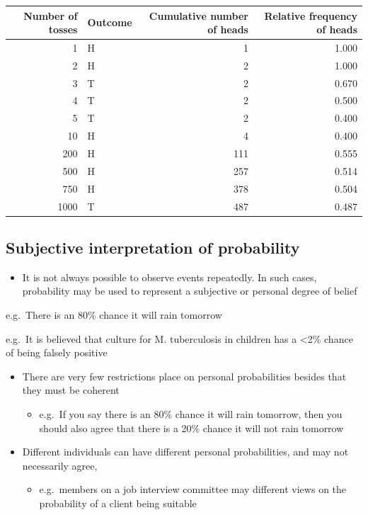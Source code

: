 \documentclass[
]{book}
\providecommand{\tightlist}{%
  \setlength{\itemsep}{0pt}\setlength{\parskip}{0pt}}
\begin{document}
\begin{tabular}{r|l|r|r}
\hline
Number of tosses & Outcome & Cumulative number of heads & Relative frequency of heads\\
\hline
1 & H & 1 & 1.000\\
\hline
2 & H & 2 & 1.000\\
\hline
3 & T & 2 & 0.670\\
\hline
4 & T & 2 & 0.500\\
\hline
5 & T & 2 & 0.400\\
\hline
10 & H & 4 & 0.400\\
\hline
200 & H & 111 & 0.555\\
\hline
500 & H & 257 & 0.514\\
\hline
750 & H & 378 & 0.504\\
\hline
1000 & T & 487 & 0.487\\
\hline
\end{tabular}

\hypertarget{subjective-interpretation-of-probability}{%
\subsection{Subjective interpretation of probability}\label{subjective-interpretation-of-probability}}

\begin{itemize}
\tightlist
\item
  It is not always possible to observe events repeatedly. In such cases, probability may be used to represent a subjective or personal degree of belief
\end{itemize}

e.g.~There is an 80\% chance it will rain tomorrow

e.g.~It is believed that culture for M. tuberculosis in children has a \textless2\% chance of being falsely positive

\begin{itemize}
\tightlist
\item
  There are very few restrictions place on personal probabilities besides that they must be coherent

  \begin{itemize}
  \tightlist
  \item
    e.g.~If you say there is an 80\% chance it will rain tomorrow, then you should also agree that there is a 20\% chance it will not rain tomorrow
  \end{itemize}
\item
  Different individuals can have different personal probabilities, and may not necessarily agree,

  \begin{itemize}
  \tightlist
  \item
    e.g.~members on a job interview committee may different views on the probability of a client being suitable
  \end{itemize}
\end{itemize}
\end{document}
